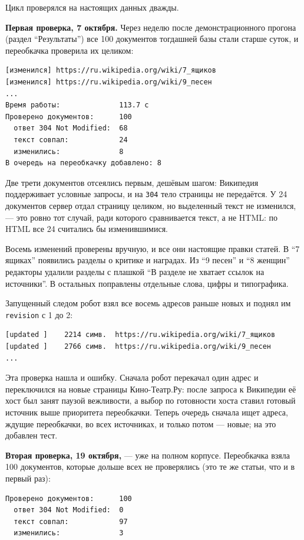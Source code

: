 Цикл проверялся на настоящих данных дважды.

\textbf{Первая проверка, 7 октября.} Через неделю после демонстрационного
прогона (раздел \enquote{Результаты}) все 100 документов тогдашней базы стали
старше суток, и переобкачка проверила их целиком:

\begin{verbatim}
[изменился] https://ru.wikipedia.org/wiki/7_ящиков
[изменился] https://ru.wikipedia.org/wiki/9_песен
...
Время работы:              113.7 с
Проверено документов:      100
  ответ 304 Not Modified:  68
  текст совпал:            24
  изменились:              8
В очередь на переобкачку добавлено: 8
\end{verbatim}

Две трети документов отсеялись первым, дешёвым шагом: Википедия поддерживает
условные запросы, и на \texttt{304} тело страницы не передаётся. У 24 документов
сервер отдал страницу целиком, но выделенный текст не изменился, --- это ровно
тот случай, ради которого сравнивается текст, а не HTML: по HTML все 24
считались бы изменившимися.

Восемь изменений проверены вручную, и все они настоящие правки статей. В
\enquote{7 ящиках} появились разделы о критике и наградах. Из \enquote{9 песен}
и \enquote{8 женщин} редакторы удалили разделы с плашкой \enquote{В разделе не
хватает ссылок на источники}. В остальных поправлены отдельные слова, цифры и
типографика.

Запущенный следом робот взял все восемь адресов раньше новых и поднял им
\texttt{revision} с 1 до 2:

\begin{verbatim}
[updated ]    2214 симв.  https://ru.wikipedia.org/wiki/7_ящиков
[updated ]    2766 симв.  https://ru.wikipedia.org/wiki/9_песен
...
\end{verbatim}

Эта проверка нашла и ошибку. Сначала робот перекачал один адрес и переключился
на новые страницы Кино-Театр.Ру: после запроса к Википедии её хост был занят
паузой вежливости, а выбор по готовности хоста ставил готовый источник выше
приоритета переобкачки. Теперь очередь сначала ищет адреса, ждущие переобкачки,
во всех источниках, и только потом --- новые; на это добавлен тест.

\textbf{Вторая проверка, 19 октября,} --- уже на полном корпусе. Переобкачка взяла
100 документов, которые дольше всех не проверялись (это те же статьи, что и в
первый раз):

\begin{verbatim}
Проверено документов:      100
  ответ 304 Not Modified:  0
  текст совпал:            97
  изменились:              3
\end{verbatim}


